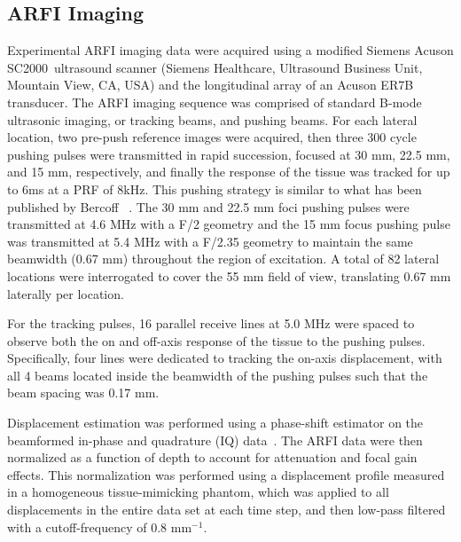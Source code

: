 \subsection{ARFI Imaging}
Experimental ARFI imaging data were acquired using a modified Siemens Acuson
SC2000\texttrademark~ultrasound scanner (Siemens Healthcare, Ultrasound Business Unit,
Mountain View, CA, USA) and the longitudinal array of an Acuson ER7B
transducer.  The ARFI imaging sequence was comprised of
standard B-mode ultrasonic imaging, or tracking beams, and pushing beams. For
each lateral location, two pre-push reference images were acquired, then three
300 cycle pushing pulses were transmitted in rapid succession, focused at 30
mm, 22.5 mm, and 15 mm, respectively, and finally the response of the tissue
was tracked for up to 6ms at a PRF of 8kHz. This pushing strategy is similar to
what has been published by Bercoff \etal~\cite{Bercoff2004}. The 30 mm and 22.5
mm foci pushing pulses were transmitted at 4.6 MHz with a F/2 geometry and the
15 mm focus pushing pulse was transmitted at 5.4 MHz with a F/2.35 geometry to
maintain the same beamwidth (0.67 mm) throughout the region of excitation. A
total of 82 lateral locations were interrogated to cover the 55 mm field of
view, translating 0.67 mm laterally per location.

For the tracking pulses, 16 parallel receive lines at 5.0 MHz were spaced to
observe both the on and off-axis response of the tissue to the pushing pulses.
Specifically, four lines were dedicated to tracking the on-axis displacement,
with all 4 beams located inside the beamwidth of the pushing pulses such that
the beam spacing was 0.17 mm. 

Displacement estimation was performed using a phase-shift estimator on the
beamformed in-phase and quadrature (IQ) data~\cite{Loupas95,pinton06}. The ARFI
data were then normalized as a function of depth to account for attenuation and
focal gain effects.  This normalization was performed using a displacement
profile measured in a homogeneous tissue-mimicking phantom, which was applied
to all displacements in the entire data set at each time step, and then
low-pass filtered with a cutoff-frequency of 0.8 mm$^{-1}$.
